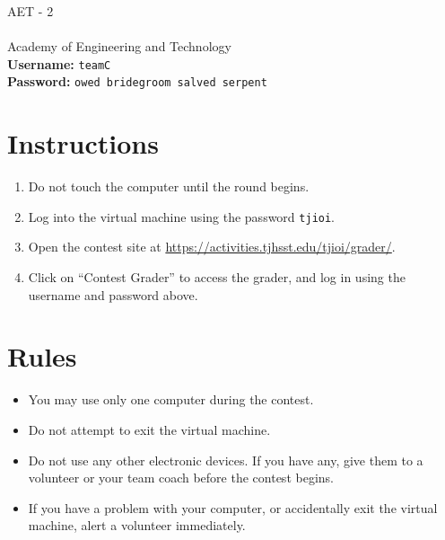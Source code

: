 \documentclass[12pt]{article}
\begin{document}
{\Huge AET - 2}\\\\
{\Large Academy of Engineering and Technology}\\

\textbf{Username:} \verb|teamC|\\
\textbf{Password:} \verb|owed bridegroom salved serpent|

\section*{Instructions}

\begin{enumerate}
    \item Do not touch the computer until the round begins.
    \item Log into the virtual machine using the password \verb|tjioi|.
    \item Open the contest site at \url{https://activities.tjhsst.edu/tjioi/grader/}.
    \item Click on ``Contest Grader'' to access the grader, and log in using the username and password above.
\end{enumerate}

\section*{Rules}

\begin{itemize}
    \item You may use only one computer during the contest.
    \item Do not attempt to exit the virtual machine.
    \item Do not use any other electronic devices. If you have any, give them to a volunteer or your team coach before the contest begins.
    \item If you have a problem with your computer, or accidentally exit the virtual machine, alert a volunteer immediately.
\end{itemize}
\end{document}

